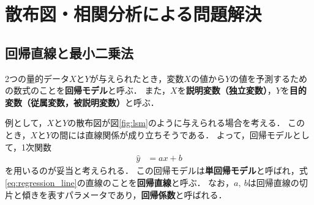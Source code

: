 %
%
%
%
%


\clearpage
\section{散布図・相関分析による問題解決}

\subsection{回帰直線と最小二乗法}
%
2つの量的データ$ X $と$ Y $が与えられたとき，変数$ X $の値から$ Y $の値を予測するための数式のことを\textbf{回帰モデル}と呼ぶ．
%
また，$ X $を\textbf{説明変数（独立変数）}，$ Y $を\textbf{目的変数（従属変数，被説明変数）}と呼ぶ．
%

%
例として，$ X $と$ Y $の散布図が図\ref{fig:lsm}のように与えられる場合を考える．
%
このとき，$ X $と$ Y $の間には直線関係が成り立ちそうである．
%
よって，回帰モデルとして，1次関数
%
\begin{align}
	\hat{y} &= ax + b
	\label{eq:regression_line}
\end{align}
%
を用いるのが妥当と考えられる．
%
この回帰モデルは\textbf{単回帰モデル}と呼ばれ，式\eqref{eq:regression_line}の直線のことを\textbf{回帰直線}と呼ぶ．
%
なお，$ a,\ b $は回帰直線の切片と傾きを表すパラメータであり，\textbf{回帰係数}と呼ばれる．
%

